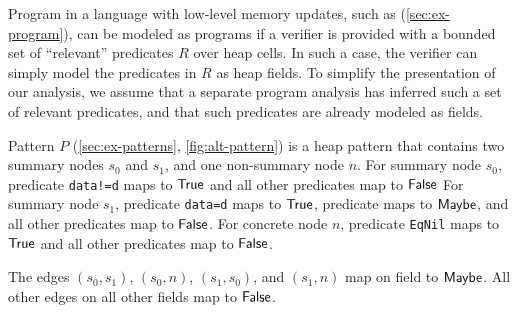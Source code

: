 Program in a language with low-level memory updates, such as \altlist
(\autoref{sec:ex-program}), can be modeled as \lang programs if a
verifier is provided with a bounded set of ``relevant'' predicates $R$
over heap cells.
%
In such a case, the verifier can simply model the predicates in $R$ as
heap fields.
%
To simplify the presentation of our analysis, we assume that a
separate program analysis has inferred such a set of relevant
predicates, and that such predicates are already modeled as \lang
fields.
%


\begin{ex}
  \label{ex:heap-pats-defn}
  Pattern $P$ (\autoref{sec:ex-patterns}, \autoref{fig:alt-pattern})
  is a heap pattern
  that contains two summary nodes $s_0$ and $s_1$, and one non-summary
  node $n$.
  For summary node $s_0$, predicate \texttt{data!=d} maps to $\mathsf{True}$
  and all other predicates map to $\mathsf{False}$
  For summary node $s_1$, predicate \texttt{data=d} maps to $\mathsf{True}$,
  predicate \lsnm maps to $\mathsf{Maybe}$, and all other predicates map to
  $\mathsf{False}$.
  For concrete node $n$, predicate \texttt{EqNil} maps to $\mathsf{True}$ and
  all other predicates map to $\mathsf{False}$.

  The edges $(s_0, s_1)$, $(s_0, n)$, $(s_1, s_0)$, and $(s_1, n)$ map
  on field \nextnm to $\mathsf{Maybe}$.
  All other edges on all other fields map to $\mathsf{False}$.
\end{ex}

